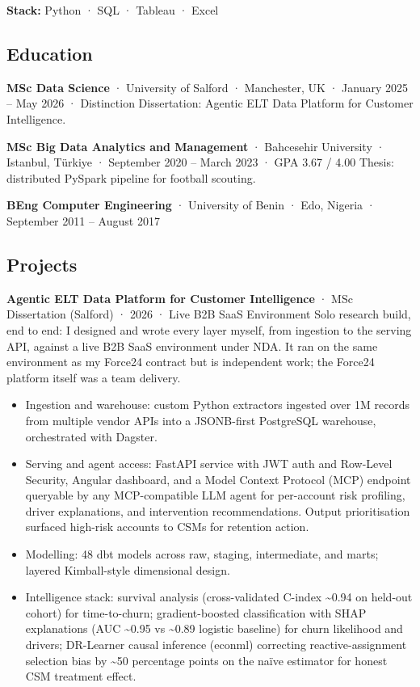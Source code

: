 \documentclass[
  10pt,
]{article}
\providecommand{\tightlist}{%
  \setlength{\itemsep}{0pt}\setlength{\parskip}{0pt}}
\begin{document}
\textbf{Stack:} Python · SQL · Tableau · Excel

\subsection{Education}\label{education}

\textbf{MSc Data Science} · University of Salford · Manchester, UK ·
January 2025 -- May 2026 · Distinction Dissertation: Agentic ELT Data
Platform for Customer Intelligence.

\textbf{MSc Big Data Analytics and Management} · Bahcesehir University ·
Istanbul, Türkiye · September 2020 -- March 2023 · GPA 3.67 / 4.00
Thesis: distributed PySpark pipeline for football scouting.

\textbf{BEng Computer Engineering} · University of Benin · Edo, Nigeria
· September 2011 -- August 2017

\subsection{Projects}\label{projects}

\textbf{Agentic ELT Data Platform for Customer Intelligence} · MSc
Dissertation (Salford) · 2026 · Live B2B SaaS Environment Solo research
build, end to end: I designed and wrote every layer myself, from
ingestion to the serving API, against a live B2B SaaS environment under
NDA. It ran on the same environment as my Force24 contract but is
independent work; the Force24 platform itself was a team delivery.

\begin{itemize}
\tightlist
\item
  Ingestion and warehouse: custom Python extractors ingested over 1M
  records from multiple vendor APIs into a JSONB-first PostgreSQL
  warehouse, orchestrated with Dagster.
\item
  Serving and agent access: FastAPI service with JWT auth and Row-Level
  Security, Angular dashboard, and a Model Context Protocol (MCP)
  endpoint queryable by any MCP-compatible LLM agent for per-account
  risk profiling, driver explanations, and intervention recommendations.
  Output prioritisation surfaced high-risk accounts to CSMs for
  retention action.
\item
  Modelling: 48 dbt models across raw, staging, intermediate, and marts;
  layered Kimball-style dimensional design.
\item
  Intelligence stack: survival analysis (cross-validated C-index
  \textasciitilde0.94 on held-out cohort) for time-to-churn;
  gradient-boosted classification with SHAP explanations (AUC
  \textasciitilde0.95 vs \textasciitilde0.89 logistic baseline) for
  churn likelihood and drivers; DR-Learner causal inference (econml)
  correcting reactive-assignment selection bias by \textasciitilde50
  percentage points on the naïve estimator for honest CSM treatment
  effect.
\end{itemize}
\end{document}
